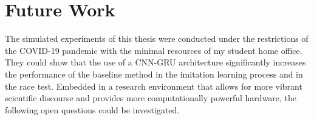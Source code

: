 







\section{Future Work}
The simulated experiments of this thesis were conducted under the restrictions of the COVID-19 pandemic 
with the minimal resources of my student home office.
They could show that the use of a CNN-GRU architecture
significantly increases the performance of the baseline method 
in the imitation learning process and in the race test.
Embedded in a research environment that allows for more vibrant scientific discourse 
and provides more computationally powerful hardware, 
the following open questions could be investigated.



